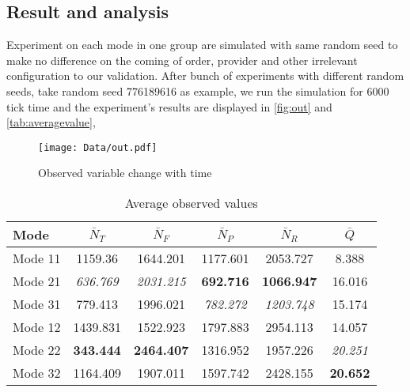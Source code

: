 \subsection{Result and analysis} %
\label{ssub:result_and_analysis}
Experiment on each mode in one group are simulated with same random seed to make no difference on the coming of order, provider and other irrelevant configuration to our validation.  After bunch of experiments with different random seeds, take random seed 776189616 as example, we run the simulation for 6000 tick time and the experiment's results are displayed in \autoref{fig:out} and \autoref{tab:averagevalue},
\begin{figure}[htbp]
    \centering
    \texttt{[image: Data/out.pdf]}
    \caption{Observed variable change with time}
    \label{fig:out}
\end{figure}
\begin{table}[htbp]
    \caption{Average observed values}
    \label{tab:averagevalue}
    \centering
    \scriptsize
    \begin{tabular}{lccccc}
    \toprule
    \textbf{Mode} & $\bar N_T$ & $\bar N_F$ & $\bar N_P$ & $\bar N_R $ & $\bar Q$\\
    \midrule
    Mode 11 & 1159.36 &  1644.201 &  1177.601 &  2053.727 &  8.388\\
    Mode 21 & \textit{636.769} &  \textit{2031.215} &  \textbf{692.716} &  \textbf{1066.947} &  16.016\\
    Mode 31 & 779.413 &  1996.021 &  \textit{782.272} &  \textit{1203.748} &  15.174\\
    Mode 12 & 1439.831 &  1522.923 &  1797.883 &  2954.113 &  14.057\\
    Mode 22 & \textbf{343.444} &  \textbf{2464.407} &  1316.952 &  1957.226 &  \textit{20.251}\\
    Mode 32 & 1164.409 &  1907.011 &  1597.742 &  2428.155 &  \textbf{20.652}\\

    \bottomrule
    \end{tabular}
\end{table}
